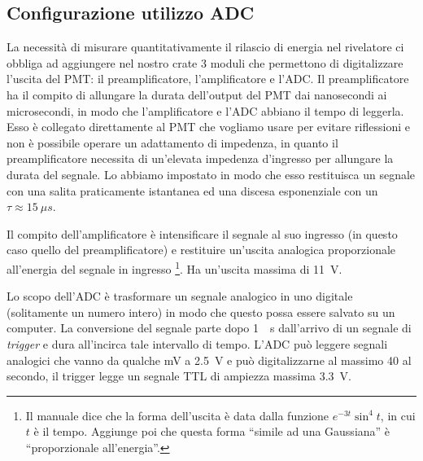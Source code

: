 
\subsection{Configurazione utilizzo ADC}  %

La necessità di misurare quantitativamente il rilascio di energia nel rivelatore ci obbliga ad aggiungere nel nostro crate 3 moduli che permettono di digitalizzare l'uscita del PMT: il preamplificatore, l'amplificatore e l'ADC. Il preamplificatore ha il compito di allungare la durata dell'output del PMT dai nanosecondi ai microsecondi, in modo che l'amplificatore e l'ADC abbiano il tempo di leggerla. Esso è collegato direttamente al PMT che vogliamo usare per evitare riflessioni e non è possibile operare un adattamento di impedenza, in quanto il preamplificatore necessita di un'elevata impedenza d'ingresso per allungare la durata del segnale. 
Lo abbiamo impostato in modo che esso restituisca un segnale con una salita praticamente istantanea ed una discesa esponenziale  con un $\tau\approx\SI{15}{\mu s}$.

Il compito dell'amplificatore è intensificare il segnale al suo ingresso (in questo caso quello del preamplificatore) e restituire un'uscita analogica proporzionale all'energia del segnale in ingresso%
\footnote{Il manuale dice che la forma dell'uscita è data dalla funzione $e^{-3t}\sin^4{t}$, in cui $t$ è il tempo. Aggiunge poi che questa forma ``simile ad una Gaussiana'' è ``proporzionale all'energia''.}.
Ha un'uscita massima di \SI{11}{V}.

Lo scopo dell'ADC è trasformare un segnale analogico in uno digitale (solitamente un numero intero) in modo che questo possa essere salvato su un computer.  
La conversione del segnale parte dopo \SI{1}{\mu s} dall'arrivo di un segnale di \emph{trigger} e dura all'incirca tale intervallo di tempo. L'ADC può leggere segnali analogici che vanno da qualche \si{mV} a \SI{2.5}{V} e può digitalizzarne al massimo 40 al secondo, il trigger legge un segnale TTL di ampiezza massima \SI{3.3}{V}. 

